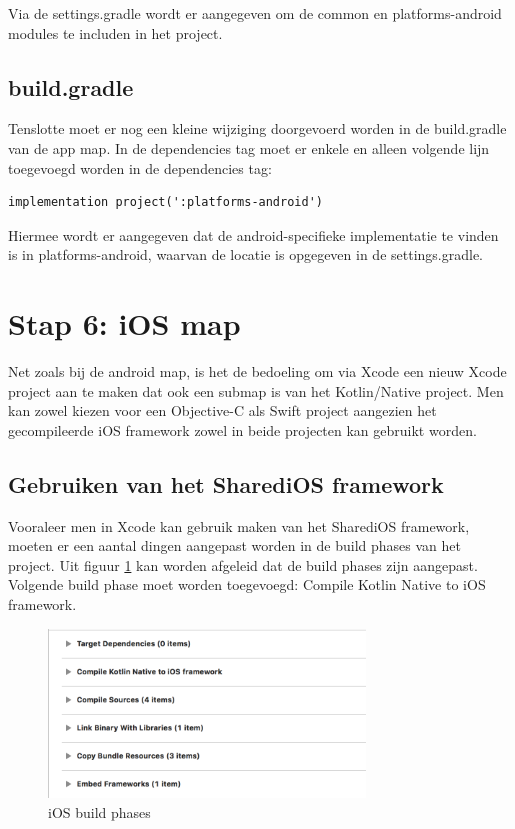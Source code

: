 Via de settings.gradle wordt er aangegeven om de common en platforms-android modules te includen in het project.

\subsection{build.gradle}
Tenslotte moet er nog een kleine wijziging doorgevoerd worden in de build.gradle van de app map. In de dependencies tag moet er enkele en alleen volgende lijn toegevoegd worden in de dependencies tag:

\begin{lstlisting}
implementation project(':platforms-android')
\end{lstlisting}

Hiermee wordt er aangegeven dat de android-specifieke implementatie te vinden is in platforms-android, waarvan de locatie is opgegeven in de settings.gradle. 

\section{Stap 6: iOS map}
\label{sec:ios-stap6}
Net zoals bij de android map, is het de bedoeling om via Xcode een nieuw Xcode project aan te maken dat ook een submap is van het Kotlin/Native project. Men kan zowel kiezen voor een Objective-C als Swift project aangezien het gecompileerde iOS framework zowel in beide projecten kan gebruikt worden.

\subsection{Gebruiken van het SharediOS framework}
Vooraleer men in Xcode kan gebruik maken van het SharediOS framework, moeten er een aantal dingen aangepast worden in de build phases van het project. Uit figuur \ref{fig:stap6-phases} kan worden afgeleid dat de build phases zijn aangepast. Volgende build phase moet worden toegevoegd: Compile Kotlin Native to iOS framework.
\begin{figure} [ht]
	\centering
	\includegraphics[width=0.75\textwidth]{img/stap6-phases.png}
	\caption{iOS build phases}
	\label{fig:stap6-phases}
\end{figure}

